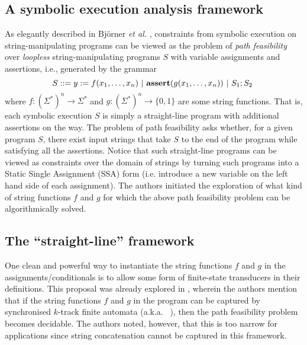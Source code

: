 \subsection{A symbolic execution analysis framework}
As elegantly described in Bj\"{o}rner \emph{et al.} \cite{BTV09}, constraints 
from symbolic 
execution on string-manipulating programs can be viewed as the problem of \emph{path 
feasibility} over \emph{loopless} string-manipulating programs $S$ with variable 
assignments and assertions, i.e., generated by the grammar
\begin{equation*}
    S ::= y := f(x_1,\ldots,x_n) \ |\ \text{\ASSERT{$g(x_1,\ldots,x_n)$}}\ |\ 
            S_1; S_2\ 
\end{equation*}
where $f: (\Sigma^*)^n \to \Sigma^*$ and $g: (\Sigma^*)^n \to \{0,1\}$ are
some string functions. 
That is, each symbolic execution $S$ is simply a 
straight-line
program with additional assertions on the way. The problem of path feasibility 
asks whether, for a given program $S$, there exist input strings that take
$S$ to the end of the program while satisfying all the assertions.
Notice that such straight-line programs can be viewed as constraints over the 
domain of strings by turning such programs 
into a Static Single Assignment (SSA) form (i.e. introduce a new variable 
on the left hand side of each assignment). The authors initiated the exploration
of what kind of string functions $f$ and $g$ for which the above path 
feasibility problem can be algorithmically solved. 

\subsection{The ``straight-line'' framework}
One clean and powerful way to instantiate the string functions $f$ and $g$
in the assignments/conditionals is to allow some form of finite-state
transducers in their definitions.
%
This proposal was already explored in \cite{BTV09}, wherein the authors mention
that
%
if the string functions $f$ and $g$ in the program can be captured by 
synchronised $k$-track finite automata (a.k.a.~ 
\cite{BG04}), then
the path feasibility problem becomes decidable. The authors noted, however, that
this is too narrow for applications since string concatenation cannot be
captured in this framework. 

